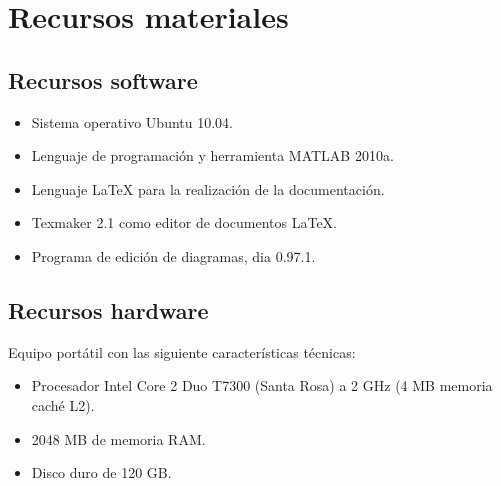 	\section{Recursos materiales}
		
		\subsection{Recursos software}
			
			\begin{itemize}
				\item Sistema operativo Ubuntu 10.04.
				\item Lenguaje de programación y herramienta MATLAB 2010a.
				\item Lenguaje \LaTeX{} para la realización de la documentación.
				\item Texmaker 2.1 como editor de documentos \LaTeX{}.
				\item Programa de edición de diagramas, dia 0.97.1.
			\end{itemize}
			
		\subsection{Recursos hardware}
			
			Equipo portátil con las siguiente características técnicas:
			
			\begin{itemize}
				\item Procesador Intel Core 2 Duo T7300 (Santa Rosa) a 2 GHz (4 MB memoria caché L2).
				\item 2048 MB de memoria RAM.
				\item Disco duro de 120 GB.
			\end{itemize}
